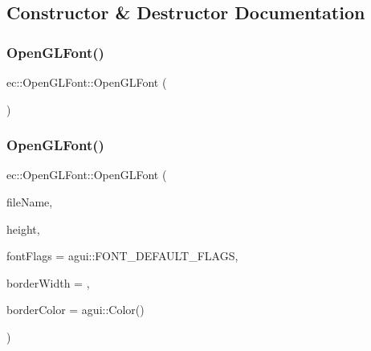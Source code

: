 \subsection{Constructor \& Destructor Documentation}
\mbox{\label{classec_1_1_open_g_l_font_aeacd7f309c6510b5ca6277ff3babaf3e}} 
\subsubsection{\texorpdfstring{Open\+G\+L\+Font()}{OpenGLFont()}\hspace{0.1cm}{\footnotesize\ttfamily [1/2]}}
{\footnotesize\ttfamily ec\+::\+Open\+G\+L\+Font\+::\+Open\+G\+L\+Font (\begin{DoxyParamCaption}{ }\end{DoxyParamCaption})\hspace{0.3cm}{\ttfamily [explicit]}}

\mbox{\label{classec_1_1_open_g_l_font_a61acb43aec32afe90dae21e04e3a978e}} 
\subsubsection{\texorpdfstring{Open\+G\+L\+Font()}{OpenGLFont()}\hspace{0.1cm}{\footnotesize\ttfamily [2/2]}}
{\footnotesize\ttfamily ec\+::\+Open\+G\+L\+Font\+::\+Open\+G\+L\+Font (\begin{DoxyParamCaption}\item[{const std\+::string \&}]{file\+Name,  }\item[{int}]{height,  }\item[{agui\+::\+Font\+Flags}]{font\+Flags = {\ttfamily agui\+:\+:FONT\+\_\+DEFAULT\+\_\+FLAGS},  }\item[{float}]{border\+Width = {},  }\item[{agui\+::\+Color}]{border\+Color = {\ttfamily agui\+:\+:Color()} }\end{DoxyParamCaption})\hspace{0.3cm}{\ttfamily [explicit]}}

